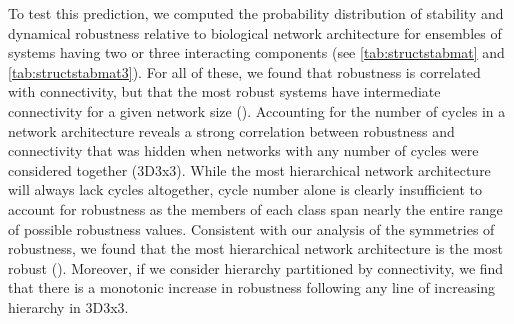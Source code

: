 To test this prediction, we computed the probability distribution of stability and dynamical robustness relative to biological network architecture for ensembles of systems having two or three interacting components (see \ref{tab:structstabmat} and \ref{tab:structstabmat3}). For all of these, we found that robustness is correlated with connectivity, but that the most robust systems have intermediate connectivity for a given network size (). Accounting for the number of cycles in a network architecture reveals a strong correlation between robustness and connectivity that was hidden when networks with any number of cycles were considered together (3D3x3). While the most hierarchical network architecture will always lack cycles altogether, cycle number alone is clearly insufficient to account for robustness as the members of each class span nearly the entire range of possible robustness values. Consistent with our analysis of the symmetries of robustness, we found that the most hierarchical network architecture is the most robust (). Moreover, if we consider hierarchy partitioned by connectivity, we find that there is a monotonic increase in robustness following any line of increasing hierarchy in 3D3x3.

